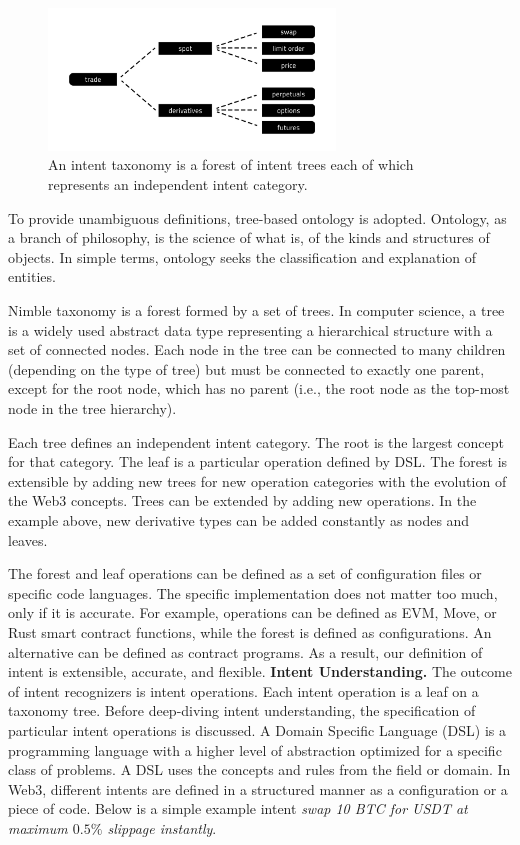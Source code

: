 \documentclass[11pt,letterpaper,twocolumn]{article}
\begin{document}
\begin{figure}[t]
\centering
\includegraphics[width=3in]{fig/intent-taxonomy-hr.png}
\caption{An intent taxonomy is a forest of intent trees each of which represents an independent intent category.} 
\label{fig:intent-taxonomy}
\vspace{0pt}
\end{figure}

To provide unambiguous definitions, tree-based ontology is adopted. Ontology, as a branch of philosophy, is the science of what is, of the kinds and structures of objects. In simple terms, ontology seeks the classification and explanation of entities.

Nimble taxonomy is a forest formed by a set of trees. In computer science, a tree is a widely used abstract data type representing a hierarchical structure with a set of connected nodes. Each node in the tree can be connected to many children (depending on the type of tree) but must be connected to exactly one parent, except for the root node, which has no parent (i.e., the root node as the top-most node in the tree hierarchy).

Each tree defines an independent intent category. The root is the largest concept for that category. The leaf is a particular operation defined by DSL. The forest is extensible by adding new trees for new operation categories with the evolution of the Web3 concepts. Trees can be extended by adding new operations. In the example above, new derivative types can be added constantly as nodes and leaves.

The forest and leaf operations can be defined as a set of configuration files or specific code languages. The specific implementation does not matter too much, only if it is accurate. For example, operations can be defined as EVM, Move, or Rust smart contract functions, while the forest is defined as configurations. An alternative can be defined as contract programs. As a result, our definition of intent is extensible, accurate, and flexible.
\newline
\newline
\noindent \textbf{Intent Understanding.}
The outcome of intent recognizers is intent operations. Each intent operation is a leaf on a taxonomy tree. Before deep-diving intent understanding, the specification of particular intent operations is discussed. A Domain Specific Language (DSL) is a programming language with a higher level of abstraction optimized for a specific class of problems. A DSL uses the concepts and rules from the field or domain. In Web3, different intents are defined in a structured manner as a configuration or a piece of code. Below is a simple example intent \emph{swap 10 BTC for USDT at maximum $0.5\%$ slippage instantly}.
\end{document}
